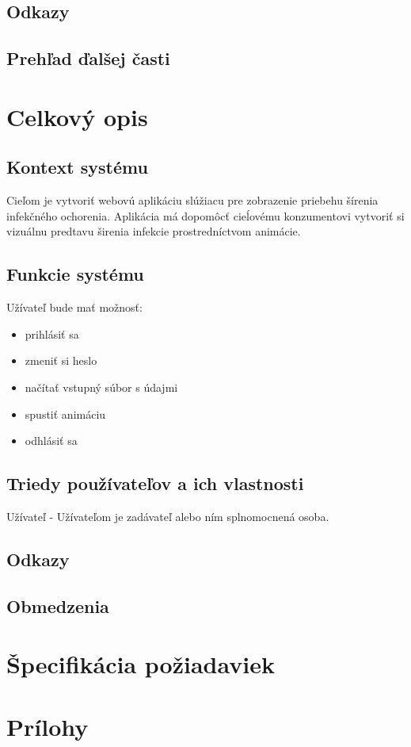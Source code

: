 \documentclass[12pt,a4paper]{report}
\begin{document}
\section[Odkazy]{\rmfamily\bfseries
	Odkazy}

\section[Prehľad ďalšej časti]{\rmfamily\bfseries
	Prehľad ďalšej časti}


\renewcommand{\chaptername}{}	
\chapter[Celkový opis]{\rmfamily\bfseries
	Celkový opis}

\section[Kontext systému]{\rmfamily\bfseries
	Kontext systému}
	Cieľom je vytvoriť webovú aplikáciu slúžiacu pre zobrazenie priebehu šírenia infekčného ochorenia. Aplikácia má dopomôcť cieĺovému konzumentovi vytvoriť si vizuálnu predtavu širenia infekcie prostredníctvom animácie.

\section[Funkcie systému]{\rmfamily\bfseries
	Funkcie systému}
Užívateľ bude mať možnosť:
\begin{itemize}
	\item prihlásiť sa 
	\item zmeniť si heslo
	\item načítať vstupný súbor s údajmi
	\item spustiť animáciu
	\item odhlásiť sa
\end{itemize}

\section[Triedy používateľov a ich vlastnosti]{\rmfamily\bfseries
	Triedy používateľov a ich vlastnosti}
Užívateľ - Užívateľom je zadávateľ alebo ním splnomocnená osoba.

\section[Odkazy]{\rmfamily\bfseries
	Odkazy}

\section[Obmedzenia]{\rmfamily\bfseries
	Obmedzenia}

\renewcommand{\chaptername}{}	
\chapter[Špecifikácia požiadaviek]{\rmfamily\bfseries
	Špecifikácia požiadaviek}

\renewcommand{\chaptername}{}	
\chapter[Prílohy]{\rmfamily\bfseries
	Prílohy}
\end{document}
